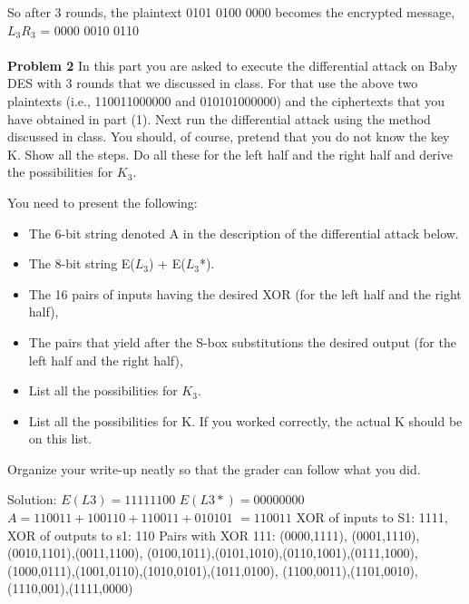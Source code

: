 \documentclass[12pt,letterpaper,final]{report}
\begin{document}
So after 3 rounds, the plaintext 0101 0100 0000 becomes the encrypted message, $L_3R_3$ = 0000 0010 0110 \\
 \\


\bigskip\noindent\textbf{Problem 2} In this part you are asked to execute the differential attack on Baby DES with 3 rounds that we discussed in class. For that use the above two plaintexts  (i.e., 110011000000 and 010101000000) and the ciphertexts that you have obtained in part (1).  Next run the differential attack using the method discussed in class.  You should, of course, pretend that you do not know the key K.  Show all the steps.  Do all these for the left half and the right half and derive the possibilities for $K_3$. 
\bigskip

You need to present the following:

\begin{itemize}
	\item The 6-bit string denoted A in the description of the differential attack below.
	\item The 8-bit string E($L_3$) + E($L_3$*). 
	\item The 16 pairs of inputs having the desired XOR (for the left half and the right half), 
	\item The pairs that yield after the S-box substitutions the desired output (for the left half and the right half),
	\item List all the possibilities for $K_3$.
	\item List all the possibilities for K. If you worked correctly, the actual K should be on this list.
\end{itemize}

Organize your write-up neatly so that the grader can follow what you did.


\bigskip Solution: 
\newline $E(L3) = 1111 1100$
\newline $E(L3*) = 0000 0000$
\newline $A = 110011 + 100110 + 110011 + 010101$
\newline $= 110011$
\newline XOR of inputs to S1: 1111, XOR of outputs to s1: 110
\newline Pairs with XOR 111:
\newline (0000,1111), (0001,1110),(0010,1101),(0011,1100),
\newline (0100,1011),(0101,1010),(0110,1001),(0111,1000),
\newline (1000,0111),(1001,0110),(1010,0101),(1011,0100),
\newline (1100,0011),(1101,0010),(1110,001),(1111,0000)
\end{document}
